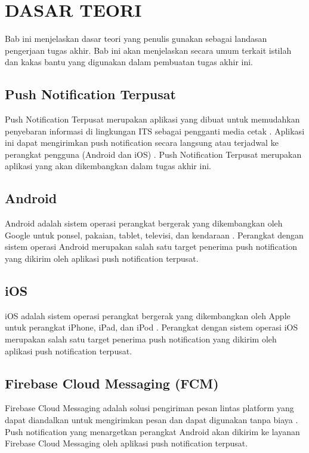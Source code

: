 \chapter{DASAR TEORI}
\par Bab ini menjelaskan dasar teori yang penulis gunakan sebagai landasan pengerjaan tugas akhir. Bab ini akan menjelaskan secara umum terkait istilah dan kakas bantu yang digunakan dalam pembuatan tugas akhir ini.

\section{Push Notification Terpusat}
\par Push Notification Terpusat merupakan aplikasi yang dibuat untuk memudahkan penyebaran informasi di lingkungan ITS sebagai pengganti media cetak \cite{application-thesis}. Aplikasi ini dapat mengirimkan push notification secara langsung atau terjadwal ke perangkat pengguna (Android dan iOS) \cite{application-thesis}. Push Notification Terpusat merupakan aplikasi yang akan dikembangkan dalam tugas akhir ini.

\section{Android}
\par Android adalah sistem operasi perangkat bergerak yang dikembangkan oleh Google untuk ponsel, pakaian, tablet, televisi, dan kendaraan \cite{android-online}. Perangkat dengan sistem operasi Android merupakan salah satu target penerima push notification yang dikirim oleh aplikasi push notification terpusat.

\section{iOS}
\par iOS adalah sistem operasi perangkat bergerak yang dikembangkan oleh Apple untuk perangkat iPhone, iPad, dan iPod \cite{ios-online}. Perangkat dengan sistem operasi iOS merupakan salah satu target penerima push notification yang dikirim oleh aplikasi push notification terpusat.

\section{Firebase Cloud Messaging (FCM)}
\par Firebase Cloud Messaging adalah solusi pengiriman pesan lintas platform yang dapat diandalkan untuk mengirimkan pesan dan dapat digunakan tanpa biaya \cite{fcm-online}. Push notification yang menargetkan perangkat Android akan dikirim ke layanan Firebase Cloud Messaging oleh aplikasi push notification terpusat.

